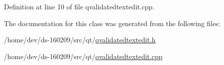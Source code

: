 Definition at line 10 of file qvalidatedtextedit.\+cpp.



The documentation for this class was generated from the following files\+:\begin{DoxyCompactItemize}
\item 
/home/dev/ds-\/160209/src/qt/\hyperlink{qvalidatedtextedit_8h}{qvalidatedtextedit.\+h}\item 
/home/dev/ds-\/160209/src/qt/\hyperlink{qvalidatedtextedit_8cpp}{qvalidatedtextedit.\+cpp}\end{DoxyCompactItemize}
